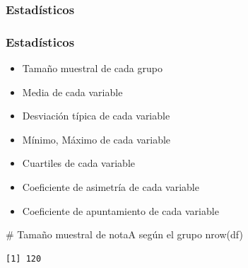 \documentclass[
  a4paper,
]{scrreport}
\newenvironment{Shaded}{\begin{snugshade}}{\end{snugshade}}
\newcommand{\CommentTok}[1]{\textcolor[rgb]{0.37,0.37,0.37}{#1}}
\newcommand{\FunctionTok}[1]{\textcolor[rgb]{0.28,0.35,0.67}{#1}}
\newcommand{\NormalTok}[1]{\textcolor[rgb]{0.00,0.23,0.31}{#1}}
\providecommand{\tightlist}{%
  \setlength{\itemsep}{0pt}\setlength{\parskip}{0pt}}\usepackage{longtable,booktabs,array}
\theoremstyle{definition}
\theoremstyle{definition}
\theoremstyle{remark}
\begin{document}
\subsubsection{Estadísticos}\label{estaduxedsticos-5}

\subsubsection{Estadísticos}\label{estaduxedsticos-6}

\begin{itemize}
\tightlist
\item
  Tamaño muestral de cada grupo
\item
  Media de cada variable
\item
  Desviación típica de cada variable
\item
  Mínimo, Máximo de cada variable
\item
  Cuartiles de cada variable
\item
  Coeficiente de asimetría de cada variable
\item
  Coeficiente de apuntamiento de cada variable
\end{itemize}

\begin{Shaded}
\begin{Highlighting}[]
\CommentTok{\# Tamaño muestral de notaA según el grupo}
\FunctionTok{nrow}\NormalTok{(df)}
\end{Highlighting}
\end{Shaded}

\begin{verbatim}
[1] 120
\end{verbatim}
\end{document}
